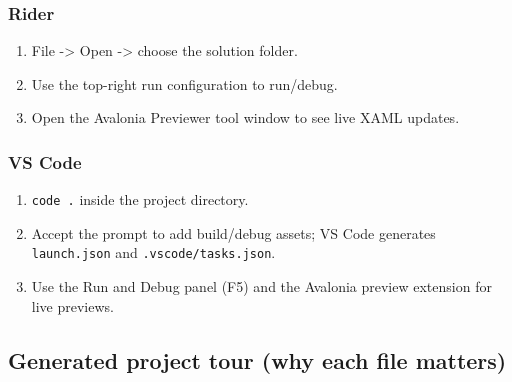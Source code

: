 \subsubsection{Rider}\label{rider}

\begin{enumerate}
\def\labelenumi{\arabic{enumi}.}
\tightlist
\item
  File -\textgreater{} Open -\textgreater{} choose the solution folder.
\item
  Use the top-right run configuration to run/debug.
\item
  Open the Avalonia Previewer tool window to see live XAML updates.
\end{enumerate}

\subsubsection{VS Code}\label{vs-code}

\begin{enumerate}
\def\labelenumi{\arabic{enumi}.}
\tightlist
\item
  \passthrough{\lstinline!code .!} inside the project directory.
\item
  Accept the prompt to add build/debug assets; VS Code generates
  \passthrough{\lstinline!launch.json!} and
  \passthrough{\lstinline!.vscode/tasks.json!}.
\item
  Use the Run and Debug panel (F5) and the Avalonia preview extension
  for live previews.
\end{enumerate}

\subsection{Generated project tour (why each file
matters)}\label{generated-project-tour-why-each-file-matters}

